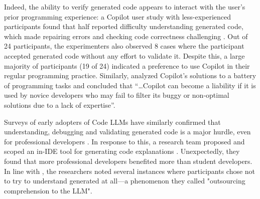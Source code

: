  
Indeed, the ability to verify generated code appears to interact with the user's prior programming experience: a Copilot user study with less-experienced participants found that half reported difficulty understanding generated code, which made repairing errors and checking code correctness challenging \cite{Vaithilingam2022ExpectationModels}. Out of 24 participants, the experimenters also observed 8 cases where the participant accepted generated code without any effort to validate it. Despite this, a large majority of participants (19 of 24) indicated a preference to use Copilot in their regular programming practice. Similarly, \citet{Dakhel2023GitHubLiability} analyzed Copilot’s solutions to a battery of programming tasks and concluded that “…Copilot can become a liability if it is used by novice developers who may fail to filter its buggy or non-optimal solutions due to a lack of expertise”.  

Surveys of early adopters of Code LLMs have similarly confirmed that understanding, debugging and validating generated code is a major hurdle, even for professional developers \cite{Russo2023NavigatingEngineering, Liang2024AChallenges}. In response to this, a research team proposed and scoped an in-IDE tool for generating code explanations \cite{Nam2024UsingUnderstanding}. Unexpectedly, they found that more professional developers benefited more than student developers. In line with \citet{Vaithilingam2022ExpectationModels}, the researchers noted several instances where participants chose not to try to understand generated  at all---a phenomenon they called "outsourcing comprehension to the LLM". 

